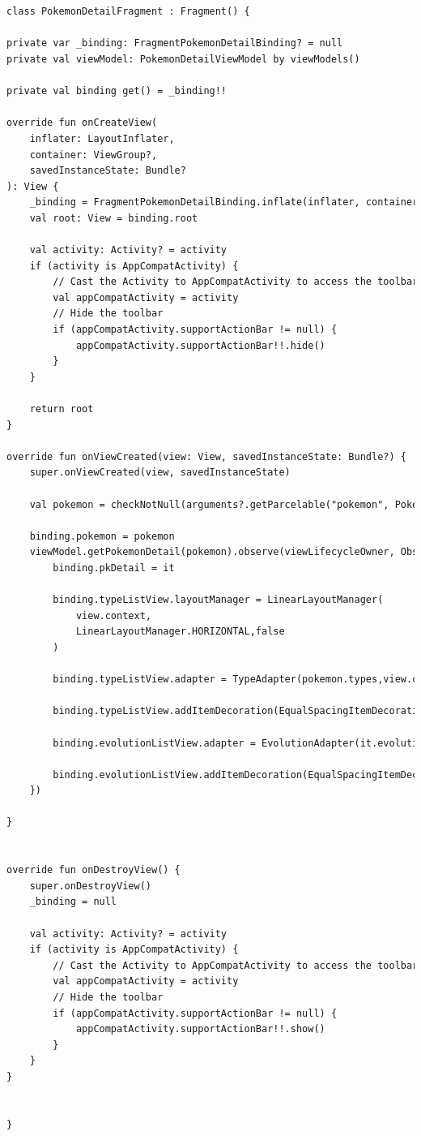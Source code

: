 \documentclass[a4paper, 12pt]{article}
\begin{document}
\begin{lstlisting}[caption={Pokemon Detail Fragment code.}, label={code:pk_detail_fragment}, language=XML]


class PokemonDetailFragment : Fragment() {

private var _binding: FragmentPokemonDetailBinding? = null
private val viewModel: PokemonDetailViewModel by viewModels()

private val binding get() = _binding!!

override fun onCreateView(
    inflater: LayoutInflater,
    container: ViewGroup?,
    savedInstanceState: Bundle?
): View {
    _binding = FragmentPokemonDetailBinding.inflate(inflater, container, false)
    val root: View = binding.root

    val activity: Activity? = activity
    if (activity is AppCompatActivity) {
        // Cast the Activity to AppCompatActivity to access the toolbar
        val appCompatActivity = activity
        // Hide the toolbar
        if (appCompatActivity.supportActionBar != null) {
            appCompatActivity.supportActionBar!!.hide()
        }
    }

    return root
}

override fun onViewCreated(view: View, savedInstanceState: Bundle?) {
    super.onViewCreated(view, savedInstanceState)

    val pokemon = checkNotNull(arguments?.getParcelable("pokemon", Pokemon::class.java))

    binding.pokemon = pokemon
    viewModel.getPokemonDetail(pokemon).observe(viewLifecycleOwner, Observer {
        binding.pkDetail = it

        binding.typeListView.layoutManager = LinearLayoutManager(
            view.context,
            LinearLayoutManager.HORIZONTAL,false
        )

        binding.typeListView.adapter = TypeAdapter(pokemon.types,view.context)

        binding.typeListView.addItemDecoration(EqualSpacingItemDecoration(30, EqualSpacingItemDecoration.HORIZONTAL));

        binding.evolutionListView.adapter = EvolutionAdapter(it.evolution!!,view.context)

        binding.evolutionListView.addItemDecoration(EqualSpacingItemDecoration(30, EqualSpacingItemDecoration.VERTICAL));
    })

}


override fun onDestroyView() {
    super.onDestroyView()
    _binding = null

    val activity: Activity? = activity
    if (activity is AppCompatActivity) {
        // Cast the Activity to AppCompatActivity to access the toolbar
        val appCompatActivity = activity
        // Hide the toolbar
        if (appCompatActivity.supportActionBar != null) {
            appCompatActivity.supportActionBar!!.show()
        }
    }
}


}

    

\end{lstlisting}  
\end{document}

